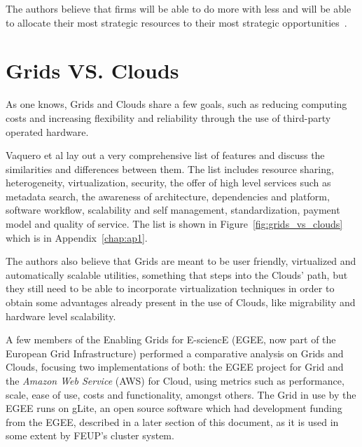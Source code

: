 The authors believe that firms will be able to do more with less and will be able to allocate their most strategic resources to their most strategic opportunities~\cite{ross}.

\section{Grids VS. Clouds} \label{sec:gridsvsclouds}

As one knows, Grids and Clouds share a few goals, such as reducing computing costs and increasing flexibility and reliability through the use of third-party operated hardware.

Vaquero et al lay out a very comprehensive list of features and discuss the similarities and differences between them. The list includes resource sharing, heterogeneity, virtualization, security, the offer of high level services such as metadata search, the awareness of architecture, dependencies and platform, software workflow, scalability and self management, standardization, payment model and quality of service. The list is shown in Figure~\ref{fig:grids_vs_clouds} which is in Appendix~\ref{chap:ap1}.

The authors also believe that Grids are meant to be user friendly, virtualized and automatically scalable utilities, something that steps into the Clouds’ path, but they still need to be able to incorporate virtualization techniques in order to obtain some advantages already present in the use of Clouds, like migrability and hardware level scalability.\cite{vaquero}

A few members of the Enabling Grids for E-sciencE (EGEE, now part of the European Grid Infrastructure) performed a comparative analysis on Grids and Clouds, focusing two implementations of both: the EGEE project for Grid and the \textit{Amazon Web Service} (AWS) for Cloud, using metrics such as performance, scale, ease of use, costs and functionality, amongst others. The Grid in use by the EGEE runs on gLite, an open source software which had development funding from the EGEE, described in a later section of this document, as it is used in some extent by FEUP's cluster system.

